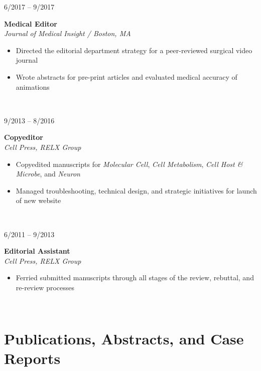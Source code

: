 \documentclass{book}
\newcommand\colleft{.20}
\newcommand\colright{.75}
\newcommand{\entryfour}[4]
	{
		\begin{minipage}[t]{\colleft\textwidth}
		\hfill \textsc{#1}
		\end{minipage}
		\hfill\vline\hfill
		\begin{minipage}[t]{\colright\textwidth}
		{\bf#2}\\
		\textit{#3}
		\footnotesize{#4}
		\end{minipage}\\
		\entryvspace
	}%
\newcommand{\entryvspace}{\vspace{0.5em}}
\begin{document}
		\entryfour{6/2017 -- 9/2017}{Medical Editor}{Journal of Medical Insight / Boston, MA}{%
		\begin{itemize}
			\item Directed the editorial department strategy for a peer-reviewed surgical video journal
			\item Wrote abstracts for pre-print articles and evaluated medical accuracy of animations
		\end{itemize}
		}
		
		\entryfour{9/2013 -- 8/2016}{Copyeditor}{Cell Press, RELX Group}{%
			\begin{itemize}
				\item Copyedited manuscripts for \emph{Molecular Cell}, \emph{Cell Metabolism}, \emph{Cell Host \& Microbe}, and \emph{Neuron}
				\item Managed troubleshooting, technical design, and strategic initiatives for launch of new website 
			\end{itemize}
		}
		
		\entryfour{6/2011 -- 9/2013}{Editorial Assistant}{Cell Press, RELX Group}{%
			\begin{itemize}
				\item Ferried submitted manuscripts through all stages of the review, rebuttal, and re-review processes
			\end{itemize}
		}
		
\section*{Publications, Abstracts, and Case Reports}
	\printbibliography[heading=subbibliography, title={Publications, Abstracts, and Case Reports}]
	
\end{document}
